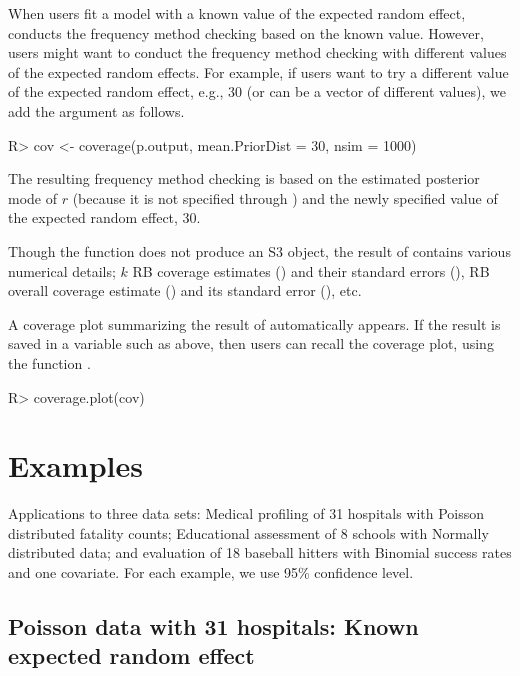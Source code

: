 \documentclass[article]{jss}
\begin{document}
When users fit a model with a known value of the expected random effect,  conducts the frequency method checking based on the known value. However, users might want to conduct the frequency method checking with different values of the expected random effects. For example, if users want to try  a different value of the expected random effect, e.g., 30 (or can be a vector of different values), we add the argument  as follows.
\begin{CodeChunk}
\begin{CodeInput}
R> cov <- coverage(p.output, mean.PriorDist = 30, nsim = 1000)
\end{CodeInput}
\end{CodeChunk}
The resulting frequency method checking is based on the estimated posterior mode of $r$ (because it is not specified through ) and the newly specified value of the expected random effect, 30.

Though the function  does not produce an S3 object,  the result of  contains various numerical details; $k$ RB coverage estimates () and their standard errors (),   RB overall coverage estimate () and its standard error (), etc.

A coverage plot summarizing the result of  automatically appears. If the result is saved in a variable such as  above, then users can  recall the coverage plot, using the function .
\begin{CodeChunk}
\begin{CodeInput}
R> coverage.plot(cov)
\end{CodeInput}
\end{CodeChunk}


\section[Examples]{Examples}\label{sec6}
Applications to three data sets: Medical profiling of 31 hospitals with Poisson distributed fatality counts; Educational assessment of 8 schools with Normally distributed data; and evaluation of 18 baseball hitters with Binomial success rates and one covariate. For each example, we use 95\% confidence level.

\subsection[Known Second-level Mean]{Poisson data with 31 hospitals: Known expected random effect}
\label{sec:ex:hosp}
\end{document}
